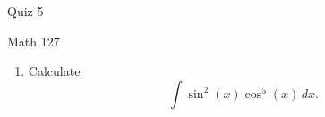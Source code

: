 \documentclass{article}
\begin{document}
\renewcommand{\headrulewidth}{0pt}
\fontsize{11}{18}\selectfont
\begin{center}
\begin{bfseries}
\noindent \Large{Quiz 5} \\ 
\end{bfseries} 
\vspace{0.3cm}
\large{Math 127} \\
\end{center}

\begin{enumerate}
\item Calculate
  $$\int \sin^{2}(x) \cos^{5}(x) \, dx. $$
\end{enumerate}
\end{document}
